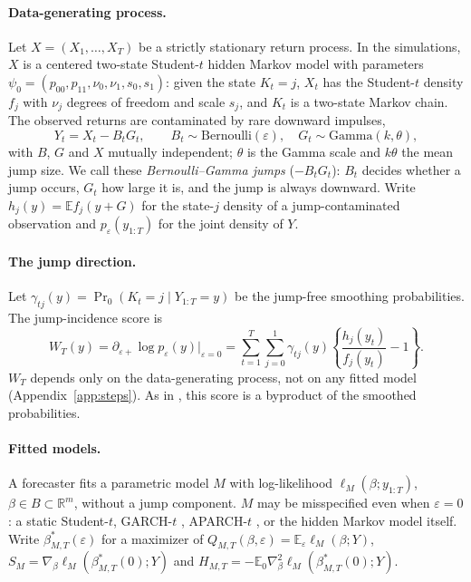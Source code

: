 \documentclass[11pt,a4paper]{article}
\theoremstyle{definition}
\theoremstyle{remark}
\newcommand{\E}{\mathbb{E}}
\begin{document}
\paragraph{Data-generating process.} Let $X=(X_1,\dots,X_T)$ be a strictly stationary return process. In the simulations, $X$ is a centered two-state Student-$t$ hidden Markov model with parameters $\psi_0=(p_{00},p_{11},\nu_0,\nu_1,s_0,s_1)$: given the state $K_t=j$, $X_t$ has the Student-$t$ density $f_j$ with $\nu_j$ degrees of freedom and scale $s_j$, and $K_t$ is a two-state Markov chain. The observed returns are contaminated by rare downward impulses,
\begin{equation}\label{eq:dgp}
Y_t=X_t-B_tG_t,\qquad B_t\sim\text{Bernoulli}(\varepsilon),\quad G_t\sim\text{Gamma}(k,\theta),
\end{equation}
with $B$, $G$ and $X$ mutually independent; $\theta$ is the Gamma scale and $k\theta$ the mean jump size. We call these \emph{Bernoulli--Gamma jumps} ($-B_tG_t$): $B_t$ decides whether a jump occurs, $G_t$ how large it is, and the jump is always downward. Write $h_j(y)=\E f_j(y+G)$ for the state-$j$ density of a jump-contaminated observation and $p_\varepsilon(y_{1:T})$ for the joint density of $Y$.

\paragraph{The jump direction.} Let $\gamma_{tj}(y)=\Pr_0(K_t=j\mid Y_{1:T}=y)$ be the jump-free smoothing probabilities. The jump-incidence score is
\begin{equation}\label{eq:W}
W_T(y)=\partial_{\varepsilon+}\log p_\varepsilon(y)\big|_{\varepsilon=0}=\sum_{t=1}^T\sum_{j=0}^1\gamma_{tj}(y)\left\{\frac{h_j(y_t)}{f_j(y_t)}-1\right\}.
\end{equation}
$W_T$ depends only on the data-generating process, not on any fitted model (Appendix~\ref{app:steps}). As in \citet{hamilton1996}, this score is a byproduct of the smoothed probabilities.

\paragraph{Fitted models.} A forecaster fits a parametric model $M$ with log-likelihood $\ell_M(\beta;y_{1:T})$, $\beta\in B\subset\mathbb R^m$, without a jump component. $M$ may be misspecified even when $\varepsilon=0$: a static Student-$t$, GARCH-$t$ \citep{bollerslev1986}, APARCH-$t$ \citep{ding1993}, or the hidden Markov model itself. Write $\beta^*_{M,T}(\varepsilon)$ for a maximizer of $Q_{M,T}(\beta,\varepsilon)=\E_\varepsilon\ell_M(\beta;Y)$, $S_M=\nabla_\beta\ell_M(\beta^*_{M,T}(0);Y)$ and $H_{M,T}=-\E_0\nabla^2_\beta\ell_M(\beta^*_{M,T}(0);Y)$.
\end{document}
